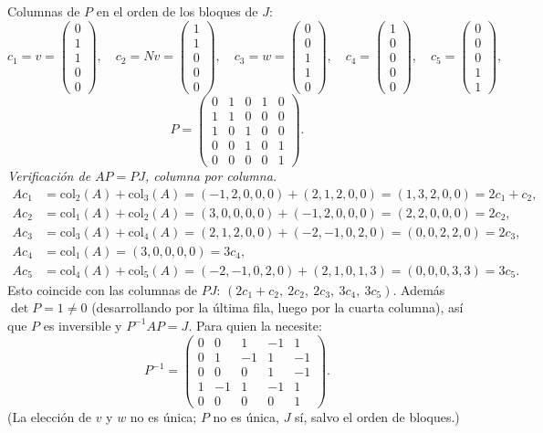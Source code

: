 \documentclass{article}
\theoremstyle{plain}
\theoremstyle{definition}
\theoremstyle{remark}
\begin{document}
Columnas de \(P\) en el orden de los bloques de \(J\):
\[
    c_1=v=\begin{pmatrix}0\\1\\1\\0\\0\end{pmatrix},\quad c_2=Nv=\begin{pmatrix}1\\1\\0\\0\\0\end{pmatrix},\quad c_3=w=\begin{pmatrix}0\\0\\1\\1\\0\end{pmatrix},\quad c_4=\begin{pmatrix}1\\0\\0\\0\\0\end{pmatrix},\quad c_5=\begin{pmatrix}0\\0\\0\\1\\1\end{pmatrix},
\]
\[
    P=\begin{pmatrix}0&1&0&1&0\\1&1&0&0&0\\1&0&1&0&0\\0&0&1&0&1\\0&0&0&0&1\end{pmatrix}.
\]
\emph{Verificación de \(AP=PJ\), columna por columna.}
\begin{align*}
    Ac_1 & =\text{col}_2(A)+\text{col}_3(A)=(-1,2,0,0,0)+(2,1,2,0,0)=(1,3,2,0,0)=2c_1+c_2, \\
    Ac_2 & =\text{col}_1(A)+\text{col}_2(A)=(3,0,0,0,0)+(-1,2,0,0,0)=(2,2,0,0,0)=2c_2,     \\
    Ac_3 & =\text{col}_3(A)+\text{col}_4(A)=(2,1,2,0,0)+(-2,-1,0,2,0)=(0,0,2,2,0)=2c_3,    \\
    Ac_4 & =\text{col}_1(A)=(3,0,0,0,0)=3c_4,                                              \\
    Ac_5 & =\text{col}_4(A)+\text{col}_5(A)=(-2,-1,0,2,0)+(2,1,0,1,3)=(0,0,0,3,3)=3c_5.
\end{align*}
Esto coincide con las columnas de \(PJ\): \((2c_1+c_2,\ 2c_2,\ 2c_3,\ 3c_4,\ 3c_5)\). Además \(\det P=1\ne0\) (desarrollando por la última fila, luego por la cuarta columna), así que \(P\) es inversible y \(P^{-1}AP=J\). Para quien la necesite:
\[
    P^{-1}=\begin{pmatrix}0&0&1&-1&1\\0&1&-1&1&-1\\0&0&0&1&-1\\1&-1&1&-1&1\\0&0&0&0&1\end{pmatrix}.
\]
(La elección de \(v\) y \(w\) no es única; \(P\) no es única, \(J\) sí, salvo el orden de bloques.)
\end{document}
